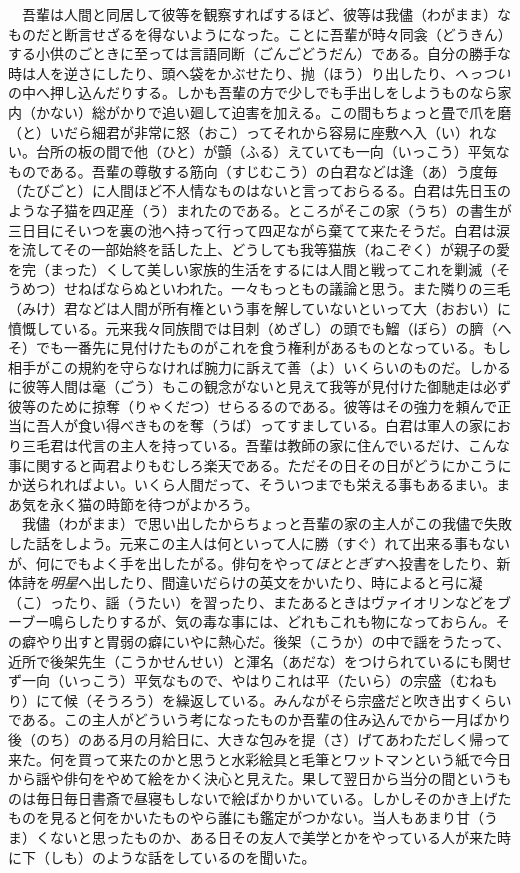 \documentclass{book}
\begin{document}
　吾輩は人間と同居して彼等を観察すればするほど、彼等は我儘（わがまま）なものだと断言せざるを得ないようになった。ことに吾輩が時々同衾（どうきん）する小供のごときに至っては言語同断（ごんごどうだん）である。自分の勝手な時は人を逆さにしたり、頭へ袋をかぶせたり、抛（ほう）り出したり、\emph{へっつい}の中へ押し込んだりする。しかも吾輩の方で少しでも手出しをしようものなら家内（かない）総がかりで追い廻して迫害を加える。この間もちょっと畳で爪を磨（と）いだら細君が非常に怒（おこ）ってそれから容易に座敷へ入（い）れない。台所の板の間で他（ひと）が顫（ふる）えていても一向（いっこう）平気なものである。吾輩の尊敬する筋向（すじむこう）の白君などは逢（あ）う度毎（たびごと）に人間ほど不人情なものはないと言っておらるる。白君は先日玉のような子猫を四疋産（う）まれたのである。ところがそこの家（うち）の書生が三日目にそいつを裏の池へ持って行って四疋ながら棄てて来たそうだ。白君は涙を流してその一部始終を話した上、どうしても我等猫族（ねこぞく）が親子の愛を完（まった）くして美しい家族的生活をするには人間と戦ってこれを剿滅（そうめつ）せねばならぬといわれた。一々もっともの議論と思う。また隣りの三毛（みけ）君などは人間が所有権という事を解していないといって大（おおい）に憤慨している。元来我々同族間では目刺（めざし）の頭でも鰡（ぼら）の臍（へそ）でも一番先に見付けたものがこれを食う権利があるものとなっている。もし相手がこの規約を守らなければ腕力に訴えて善（よ）いくらいのものだ。しかるに彼等人間は毫（ごう）もこの観念がないと見えて我等が見付けた御馳走は必ず彼等のために掠奪（りゃくだつ）せらるるのである。彼等はその強力を頼んで正当に吾人が食い得べきものを奪（うば）ってすましている。白君は軍人の家におり三毛君は代言の主人を持っている。吾輩は教師の家に住んでいるだけ、こんな事に関すると両君よりもむしろ楽天である。ただその日その日がどうにかこうにか送られればよい。いくら人間だって、そういつまでも栄える事もあるまい。まあ気を永く猫の時節を待つがよかろう。\\
　我儘（わがまま）で思い出したからちょっと吾輩の家の主人がこの我儘で失敗した話をしよう。元来この主人は何といって人に勝（すぐ）れて出来る事もないが、何にでもよく手を出したがる。俳句をやって\emph{ほととぎす}へ投書をしたり、新体詩を\emph{明星}へ出したり、間違いだらけの英文をかいたり、時によると弓に凝（こ）ったり、謡（うたい）を習ったり、またあるときはヴァイオリンなどをブーブー鳴らしたりするが、気の毒な事には、どれもこれも物になっておらん。その癖やり出すと胃弱の癖にいやに熱心だ。後架（こうか）の中で謡をうたって、近所で後架先生（こうかせんせい）と渾名（あだな）をつけられているにも関せず一向（いっこう）平気なもので、やはりこれは平（たいら）の宗盛（むねもり）にて候（そうろう）を繰返している。みんながそら宗盛だと吹き出すくらいである。この主人がどういう考になったものか吾輩の住み込んでから一月ばかり後（のち）のある月の月給日に、大きな包みを提（さ）げてあわただしく帰って来た。何を買って来たのかと思うと水彩絵具と毛筆とワットマンという紙で今日から謡や俳句をやめて絵をかく決心と見えた。果して翌日から当分の間というものは毎日毎日書斎で昼寝もしないで絵ばかりかいている。しかしそのかき上げたものを見ると何をかいたものやら誰にも鑑定がつかない。当人もあまり甘（うま）くないと思ったものか、ある日その友人で美学とかをやっている人が来た時に下（しも）のような話をしているのを聞いた。\\
\end{document}

